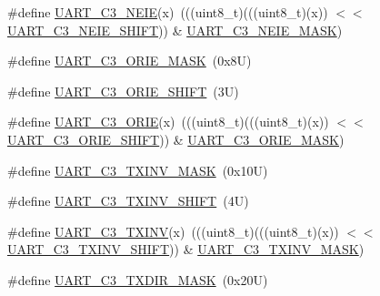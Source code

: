 \begin{DoxyCompactItemize}
\#define \mbox{\hyperlink{group___u_a_r_t___register___masks_ga7582f63e07e8c9277c1b946740b7ae65}{U\+A\+R\+T\+\_\+\+C3\+\_\+\+N\+E\+IE}}(x)~(((uint8\+\_\+t)(((uint8\+\_\+t)(x)) $<$$<$ \mbox{\hyperlink{group___u_a_r_t___register___masks_gae70ab8b995df889314915948d51ae783}{U\+A\+R\+T\+\_\+\+C3\+\_\+\+N\+E\+I\+E\+\_\+\+S\+H\+I\+FT}})) \& \mbox{\hyperlink{group___u_a_r_t___register___masks_ga1e485aea10f0176919ae060d0ee1d709}{U\+A\+R\+T\+\_\+\+C3\+\_\+\+N\+E\+I\+E\+\_\+\+M\+A\+SK}})
\item 
\#define \mbox{\hyperlink{group___u_a_r_t___register___masks_ga85999d87eca30c526580b0d060f2aff5}{U\+A\+R\+T\+\_\+\+C3\+\_\+\+O\+R\+I\+E\+\_\+\+M\+A\+SK}}~(0x8\+U)
\item 
\#define \mbox{\hyperlink{group___u_a_r_t___register___masks_ga3e65d9370ba1e2d05042db7ed72e599b}{U\+A\+R\+T\+\_\+\+C3\+\_\+\+O\+R\+I\+E\+\_\+\+S\+H\+I\+FT}}~(3\+U)
\item 
\#define \mbox{\hyperlink{group___u_a_r_t___register___masks_ga04167af161829d23c6b8ab2a6a2a85d0}{U\+A\+R\+T\+\_\+\+C3\+\_\+\+O\+R\+IE}}(x)~(((uint8\+\_\+t)(((uint8\+\_\+t)(x)) $<$$<$ \mbox{\hyperlink{group___u_a_r_t___register___masks_ga3e65d9370ba1e2d05042db7ed72e599b}{U\+A\+R\+T\+\_\+\+C3\+\_\+\+O\+R\+I\+E\+\_\+\+S\+H\+I\+FT}})) \& \mbox{\hyperlink{group___u_a_r_t___register___masks_ga85999d87eca30c526580b0d060f2aff5}{U\+A\+R\+T\+\_\+\+C3\+\_\+\+O\+R\+I\+E\+\_\+\+M\+A\+SK}})
\item 
\#define \mbox{\hyperlink{group___u_a_r_t___register___masks_ga6c9c90706e66f4bfa8fb53dd0407e579}{U\+A\+R\+T\+\_\+\+C3\+\_\+\+T\+X\+I\+N\+V\+\_\+\+M\+A\+SK}}~(0x10\+U)
\item 
\#define \mbox{\hyperlink{group___u_a_r_t___register___masks_ga99b840aeb5c25012354a1cd40ec35de7}{U\+A\+R\+T\+\_\+\+C3\+\_\+\+T\+X\+I\+N\+V\+\_\+\+S\+H\+I\+FT}}~(4\+U)
\item 
\#define \mbox{\hyperlink{group___u_a_r_t___register___masks_gaa6ad5229b8a54a92275e3b0df3e7fa34}{U\+A\+R\+T\+\_\+\+C3\+\_\+\+T\+X\+I\+NV}}(x)~(((uint8\+\_\+t)(((uint8\+\_\+t)(x)) $<$$<$ \mbox{\hyperlink{group___u_a_r_t___register___masks_ga99b840aeb5c25012354a1cd40ec35de7}{U\+A\+R\+T\+\_\+\+C3\+\_\+\+T\+X\+I\+N\+V\+\_\+\+S\+H\+I\+FT}})) \& \mbox{\hyperlink{group___u_a_r_t___register___masks_ga6c9c90706e66f4bfa8fb53dd0407e579}{U\+A\+R\+T\+\_\+\+C3\+\_\+\+T\+X\+I\+N\+V\+\_\+\+M\+A\+SK}})
\item 
\#define \mbox{\hyperlink{group___u_a_r_t___register___masks_gae9909f5ed584e6647deec86775f025e7}{U\+A\+R\+T\+\_\+\+C3\+\_\+\+T\+X\+D\+I\+R\+\_\+\+M\+A\+SK}}~(0x20\+U)
$$
\end{DoxyCompactItemize}
